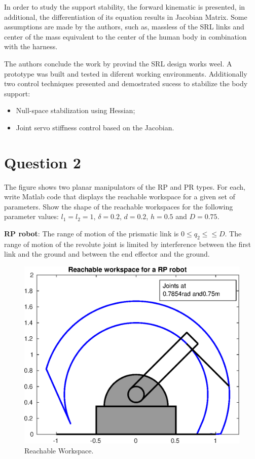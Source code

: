 \documentclass[a4paper,10pt]{article}
\begin{document}
In order to study the support stability, the forward kinematic is presented, in additional, the differentiation of its equation results in Jacobian Matrix. Some assumptions are made by the authors, such as, massless of the SRL links and center of the mass equivalent to the center of the human body in combination with the harness. 

The authors conclude the work by provind the SRL design works weel. A prototype was built and tested in diferent working environments. Additionally two control techniques presented and demostrated sucess to stabilize the body support: 
\begin{itemize}
 \item Null-space stabilization using Hessian;
 \item Joint servo stiffness control based on the Jacobian. 
\end{itemize}


 


\section{Question 2}

The figure shows two planar manipulators of the RP and PR
types. For each, write Matlab code that displays the reachable workspace for
a given set of parameters. Show the shape of the reachable workspaces for
the following parameter values: $l_1 = l_2 = 1$, $\delta = 0.2$, $d = 0.2$, $h = 0.5$ and $D = 0.75$.

\hfill \break
\textbf{RP robot}: The range of motion of the prismatic link is $0 \leq q_2 \leq≤ D$. The
range of motion of the revolute joint is limited by interference between
the first link and the ground and between the end effector and the ground.

\begin{figure}[H]
  \centering
  \includegraphics[width=.6\linewidth]{rprobot.eps}
  \caption{Reachable Workspace.} \label{fig:rp}
\end{figure}
\end{document}
